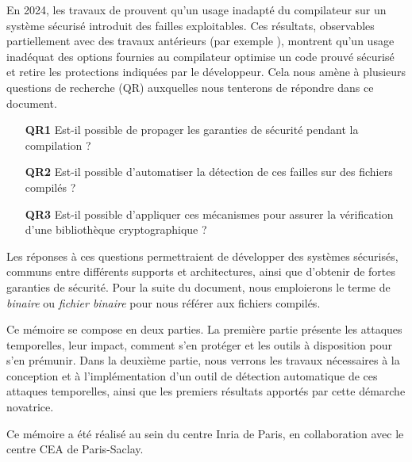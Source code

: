 En 2024, les travaux de \citeauthor{schneider2024breakingbadcompilersbreak} \cite{schneider2024breakingbadcompilersbreak} prouvent qu'un usage inadapté du compilateur sur un système sécurisé introduit des failles exploitables. Ces résultats, observables partiellement avec des travaux antérieurs (par exemple \cite{binsecRel2019}), montrent qu'un usage inadéquat des options fournies au compilateur optimise un code prouvé sécurisé et retire les protections indiquées par le développeur. Cela nous amène à plusieurs questions de recherche (QR) auxquelles nous tenterons de répondre dans ce document.
\begin{enumerate}
    \item[\textbf{QR1}] Est-il possible de propager les garanties de sécurité pendant la compilation ?
    \item[\textbf{QR2}] Est-il possible d'automatiser la détection de ces failles sur des fichiers compilés ?
    \item[\textbf{QR3}] Est-il possible d'appliquer ces mécanismes pour assurer la vérification d'une bibliothèque cryptographique ?
\end{enumerate}

Les réponses à ces questions permettraient de développer des systèmes sécurisés, communs entre différents supports et architectures, ainsi que d'obtenir de fortes garanties de sécurité. Pour la suite du document, nous emploierons le terme de \textit{binaire} ou \textit{fichier binaire} pour nous référer aux fichiers compilés.\smallbreak

Ce mémoire se compose en deux parties. La première partie présente les attaques temporelles, leur impact, comment s'en protéger et les outils à disposition pour s'en prémunir. Dans la deuxième partie, nous verrons les travaux nécessaires à la conception et à l'implémentation d'un outil de détection automatique de ces attaques temporelles, ainsi que les premiers résultats apportés par cette démarche novatrice.\medbreak

Ce mémoire a été réalisé au sein du centre Inria de Paris, en collaboration avec le centre CEA de Paris-Saclay.
